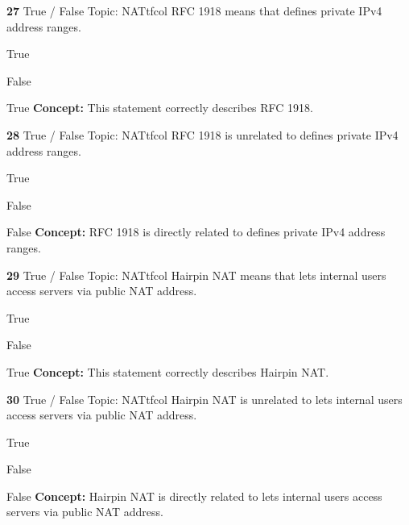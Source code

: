 \documentclass[10pt,a4paper]{article}
\begin{document}
\begin{qcard}{\color{white}\textbf{27} \hfill \small True / False \textbar{} Topic: NAT}{tfcol}
RFC 1918 means that defines private IPv4 address ranges.

\begin{qoptions}
\item True
\item False
\end{qoptions}
\begin{explainbox}{True}
\textbf{Concept:} This statement correctly describes RFC 1918.
\end{explainbox}
\end{qcard}

\begin{qcard}{\color{white}\textbf{28} \hfill \small True / False \textbar{} Topic: NAT}{tfcol}
RFC 1918 is unrelated to defines private IPv4 address ranges.

\begin{qoptions}
\item True
\item False
\end{qoptions}
\begin{explainbox}{False}
\textbf{Concept:} RFC 1918 is directly related to defines private IPv4 address ranges.
\end{explainbox}
\end{qcard}

\begin{qcard}{\color{white}\textbf{29} \hfill \small True / False \textbar{} Topic: NAT}{tfcol}
Hairpin NAT means that lets internal users access servers via public NAT address.

\begin{qoptions}
\item True
\item False
\end{qoptions}
\begin{explainbox}{True}
\textbf{Concept:} This statement correctly describes Hairpin NAT.
\end{explainbox}
\end{qcard}

\begin{qcard}{\color{white}\textbf{30} \hfill \small True / False \textbar{} Topic: NAT}{tfcol}
Hairpin NAT is unrelated to lets internal users access servers via public NAT address.

\begin{qoptions}
\item True
\item False
\end{qoptions}
\begin{explainbox}{False}
\textbf{Concept:} Hairpin NAT is directly related to lets internal users access servers via public NAT address.
\end{explainbox}
\end{qcard}
\end{document}
